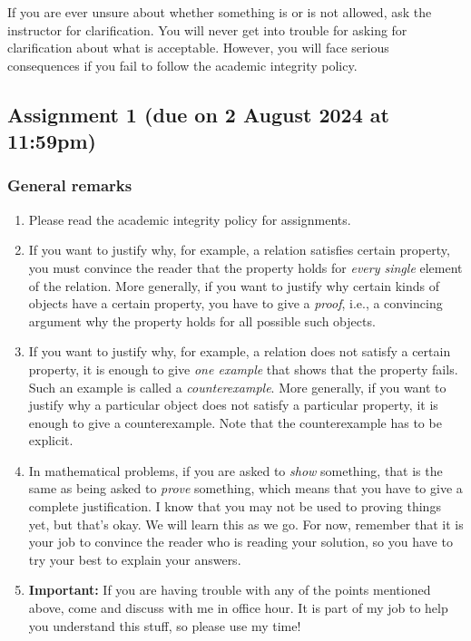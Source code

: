 \documentclass{amsart}
\begin{document}
If you are ever unsure about whether something is or is not allowed, ask the instructor for clarification.
You will never get into trouble for asking for clarification about what is acceptable.
However, you will face serious consequences if you fail to follow the academic integrity policy.
\subsection{Assignment 1 (due on 2 August 2024 at 11:59pm)}
\label{sec:org8de15d7}
\togglefalse{solutions}
\subsubsection{General remarks}
\label{sec:orgeaf2451}
\begin{enumerate}
\item Please read the academic integrity policy for assignments.

\item If you want to justify why, for example, a relation satisfies certain property, you must convince the reader that the property holds for \emph{every single} element of the relation.
More generally, if you want to justify why certain kinds of objects have a certain property, you have to give a \emph{proof}, i.e., a convincing argument why the property holds for all possible such objects.

\item If you want to justify why, for example, a relation does not satisfy a certain property, it is enough to give \emph{one example} that shows that the property fails. Such an example is called a \emph{counterexample}.
More generally, if you want to justify why a particular object does not satisfy a particular property, it is enough to give a counterexample.
Note that the counterexample has to be explicit.

\item In mathematical problems, if you are asked to \emph{show} something, that is the same as being asked to \emph{prove} something, which means that you have to give a complete justification. I know that you may not be used to proving things yet, but that's okay. We will learn this as we go. For now, remember that it is your job to convince the reader who is reading your solution, so you have to try your best to explain your answers.

\item \textbf{\textbf{Important:}} If you are having trouble with any of the points mentioned above, come and discuss with me in office hour. It is part of my job to help you understand this stuff, so please use my time!
\end{enumerate}
\end{document}
